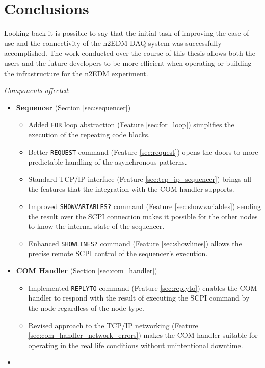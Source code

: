 \chapter{Conclusions}

Looking back it is possible to say that the initial task of improving the ease of use and the connectivity of the n2EDM DAQ system was successfully accomplished. The work conducted over the course of this thesis allows both the users and the future developers to be more efficient when operating or building the infrastructure for the n2EDM experiment.

\textit{Components affected}:
\begin{itemize}
	\item{
		\textbf{Sequencer} (Section \ref{sec:sequencer})
		\begin{itemize}
			\item Added \texttt{FOR} loop abstraction (Feature \ref{sec:for_loop}) simplifies the execution of the repeating code blocks.
			\item Better \texttt{REQUEST} command (Feature \ref{sec:request}) opens the doors to more predictable handling of the asynchronous patterns.
			\item Standard TCP/IP interface (Feature \ref{sec:tcp_ip_sequencer}) brings all the features that the integration with the COM handler supports.
			\item Improved \texttt{SHOWVARIABLES?} command (Feature \ref{sec:showvariables}) sending the result over the SCPI connection makes it possible for the other nodes to know the internal state of the sequencer.
			\item Enhanced \texttt{SHOWLINES?} command (Feature \ref{sec:showlines}) allows the precise remote SCPI control of the sequencer's execution.
		\end{itemize}
	}
	\item{
		\textbf{COM Handler} (Section \ref{sec:com_handler})
		\begin{itemize}
			\item Implemented \texttt{REPLYTO} command (Feature \ref{sec:replyto}) enables the COM handler to respond with the result of executing the SCPI command by the node regardless of the node type.
			\item Revised approach to the TCP/IP networking (Feature \ref{sec:com_handler_network_errors}) makes the COM handler suitable for operating in the real life conditions without unintentional downtime.
		\end{itemize}
	}
	\item{
}
\end{itemize}
